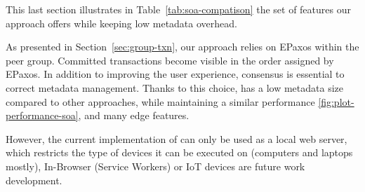 This last section
illustrates in Table~\ref{tab:soa-compatison} the set of features our approach
offers while keeping low metadata overhead. 

As presented in Section~\ref{sec:group-txn},
our approach relies on EPaxos \cite{syn:rep:1843} within the peer group.
Committed transactions become visible in the order
assigned by EPaxos.
In addition to improving the user experience, consensus is essential to
correct metadata management. 
Thanks to this choice, \system{} has a low metadata size compared to other 
approaches, while maintaining a similar performance \ref{fig:plot-performance-soa},
and many edge features.

However, the current implementation of \system{} can only be used as a local web server,
which restricts the type of devices it can be executed on (computers and laptops mostly),
In-Browser (Service Workers) or IoT devices are future work development.

